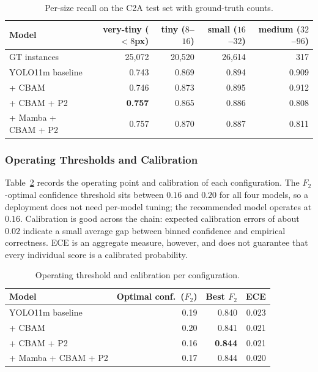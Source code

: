 \documentclass[12pt,a4paper,oneside]{report}
\begin{document}
\begin{table}[tbp]
  \centering
  \caption{Per-size recall on the C2A test set with ground-truth counts.}
  \label{tab:persize}
  \begin{tabular}{|l|r|r|r|r|}
    \hline
    Model & \makecell{very-tiny\\($<8$px)} & \makecell{tiny\\($8$--$16$)} & \makecell{small\\($16$--$32$)} & \makecell{medium\\($32$--$96$)} \\ \hline
    GT instances & 25{,}072 & 20{,}520 & 26{,}614 & 317 \\
    \hline
    YOLO11m baseline    & 0.743 & 0.869 & 0.894 & 0.909 \\ \hline
    + CBAM              & 0.746 & 0.873 & 0.895 & 0.912 \\ \hline
    + CBAM + P2         & \textbf{0.757} & 0.865 & 0.886 & 0.808 \\ \hline
    + Mamba + CBAM + P2 & 0.757 & 0.870 & 0.887 & 0.811 \\
    \hline
  \end{tabular}
\end{table}

\subsubsection{Operating Thresholds and Calibration}
Table~\ref{tab:thrcal} records the operating point and calibration of each
configuration. The $F_2$-optimal confidence threshold sits between $0.16$ and
$0.20$ for all four models, so a deployment does not need per-model tuning;
the recommended model operates at $0.16$. Calibration is good across the
chain: expected calibration errors of about $0.02$ indicate a small average
gap between binned confidence and empirical correctness. ECE is an aggregate
measure, however, and does not guarantee that every individual score is a
calibrated probability.

\begin{table}[tbp]
  \centering
  \caption{Operating threshold and calibration per configuration.}
  \label{tab:thrcal}
  \begin{tabular}{|l|r|r|r|}
    \hline
    Model & Optimal conf.\ ($F_2$) & Best $F_2$ & ECE \\
    \hline
    YOLO11m baseline    & 0.19 & 0.840 & 0.023 \\ \hline
    + CBAM              & 0.20 & 0.841 & 0.021 \\ \hline
    + CBAM + P2         & 0.16 & \textbf{0.844} & 0.021 \\ \hline
    + Mamba + CBAM + P2 & 0.17 & 0.844 & 0.020 \\
    \hline
  \end{tabular}
\end{table}
\end{document}
